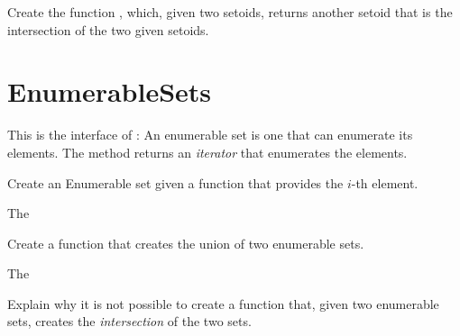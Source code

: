 
\begin{exercise}
Create the function , which, given two setoids, returns another setoid that is the intersection of the two given setoids.
%
\end{exercise}


\section{EnumerableSets}

This is the interface of :
%
%
An enumerable set is one that can enumerate its elements.
The method  returns an \emph{iterator} that enumerates the elements.

\begin{exercise}
Create an Enumerable set given a function that provides the $i$-th element.

The
%
\end{exercise}

\begin{exercise}
Create a function that creates the union of two enumerable sets.

The
%
\end{exercise}

\begin{exercise}
Explain why it is not possible to create a function that, given two enumerable sets,
creates the \emph{intersection} of the two sets.
\end{exercise}


